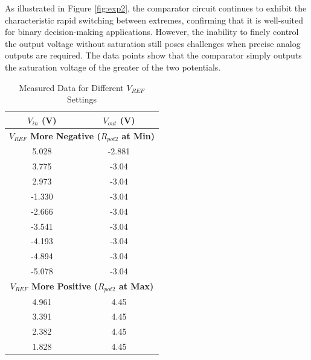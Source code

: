 \documentclass[12pt]{article}
\begin{document}
As illustrated in Figure \ref{fig:exp2}, the comparator circuit continues to
exhibit the characteristic rapid switching between extremes, confirming that it
is well-suited for binary decision-making applications. However, the inability
to finely control the output voltage without saturation still poses challenges
when precise analog outputs are required. The data points show that the
comparator simply outputs the saturation voltage of the greater of the two
potentials.
\begin{table}[H]
	\centering
	\caption{Measured Data for Different $V_{REF}$ Settings}
	\begin{tabular}{|c|c|}
		\hline
		$V_{in}$ (V) & $V_{out}$ (V)                                               \\
		\hline
		\multicolumn{2}{|c|}{\textbf{$V_{REF}$ More Negative ($R_{pot2}$ at Min)}} \\
		\hline
		5.028        & -2.881                                                      \\
		3.775        & -3.04                                                       \\
		2.973        & -3.04                                                       \\
		-1.330       & -3.04                                                       \\
		-2.666       & -3.04                                                       \\
		-3.541       & -3.04                                                       \\
		-4.193       & -3.04                                                       \\
		-4.894       & -3.04                                                       \\
		-5.078       & -3.04                                                       \\
		\hline
		\multicolumn{2}{|c|}{\textbf{$V_{REF}$ More Positive ($R_{pot2}$ at Max)}} \\
		\hline
		4.961        & 4.45                                                        \\
		3.391        & 4.45                                                        \\
		2.382        & 4.45                                                        \\
		1.828        & 4.45                                                        \\

\end{tabular}
\end{table}
\end{document}
